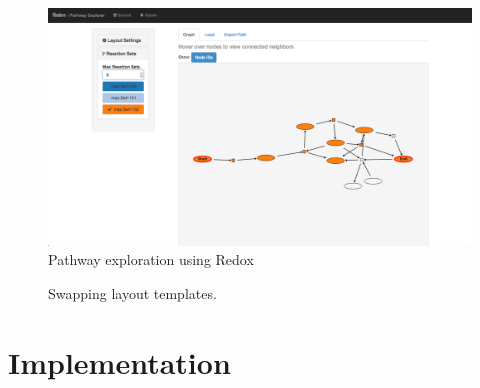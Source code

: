 \begin{figure}
  \centering
  \includegraphics[width=\textwidth,natwidth=610,natheight=642]{images/redox-ui.png}
  \caption{Pathway exploration using Redox}
  \label{Figure:redox}
\end{figure}


\begin{figure}
  \centering
  \caption{Swapping layout templates.}
  \label{Figure:redoxLayouts}
\end{figure}



\section{Implementation}
\subsection{}
\subsection{}
\subsection{}

